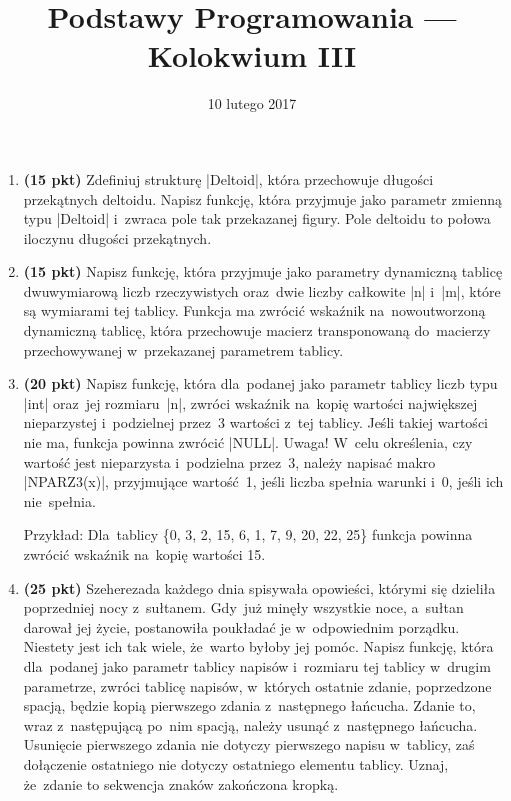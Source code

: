 \documentclass[extrafontsizes,10pt]{article}
\title{Podstawy Programowania --- Kolokwium III}
\date{10 lutego 2017}
\begin{document}
\maketitle
\DefineShortVerb{\|}
\thispagestyle{empty}
\begin{enumerate}
\itemsep1em

\item \textbf{(15 pkt)}
Zdefiniuj strukturę |Deltoid|, która przechowuje długości przekątnych deltoidu.
Napisz funkcję, która przyjmuje jako parametr zmienną typu |Deltoid|
i~zwraca pole tak przekazanej figury.
Pole deltoidu to połowa iloczynu długości przekątnych.

\item \textbf{(15 pkt)}
Napisz funkcję, która przyjmuje jako parametry dynamiczną tablicę
dwuwymiarową liczb rzeczywistych oraz~dwie liczby całkowite |n| i~|m|,
które są wymiarami tej tablicy.
Funkcja ma zwrócić wskaźnik na~nowoutworzoną dynamiczną tablicę,
która przechowuje macierz transponowaną do~macierzy
przechowywanej w~przekazanej parametrem tablicy.

\item \textbf{(20 pkt)}
Napisz funkcję, która dla~podanej jako parametr tablicy liczb typu |int|
oraz~jej rozmiaru~|n|, zwróci wskaźnik na~kopię wartości największej
nieparzystej i~podzielnej przez~3 wartości z~tej tablicy.
Jeśli takiej wartości nie ma, funkcja powinna zwrócić |NULL|.
Uwaga! W~celu określenia, czy wartość jest nieparzysta i~podzielna przez~3,
należy napisać makro |NPARZ3(x)|, przyjmujące wartość~1, jeśli liczba spełnia
warunki i~0, jeśli ich nie~spełnia.

\noindent
Przykład:
Dla~tablicy \{0, 3, 2, 15, 6, 1, 7, 9, 20, 22, 25\} funkcja powinna zwrócić wskaźnik
na~kopię wartości 15.

\item \textbf{(25 pkt)}
Szeherezada każdego dnia spisywała opowieści, którymi się dzieliła
poprzedniej nocy z~sułtanem.
Gdy~już minęły wszystkie noce, a~sułtan darował jej życie,
postanowiła poukładać je w~odpowiednim porządku.
Niestety jest ich tak wiele, że~warto byłoby jej pomóc.
Napisz funkcję, która dla~podanej jako parametr
tablicy napisów i~rozmiaru tej tablicy w~drugim parametrze,
zwróci tablicę napisów, w~których ostatnie zdanie,
poprzedzone spacją, będzie kopią pierwszego zdania z~następnego łańcucha.
Zdanie to, wraz z~następującą po~nim spacją, należy usunąć z~następnego łańcucha.
Usunięcie pierwszego zdania nie dotyczy pierwszego napisu w~tablicy,
zaś dołączenie ostatniego nie dotyczy ostatniego elementu tablicy.
Uznaj, że~zdanie to sekwencja znaków zakończona kropką.


\end{enumerate}
\end{document}
